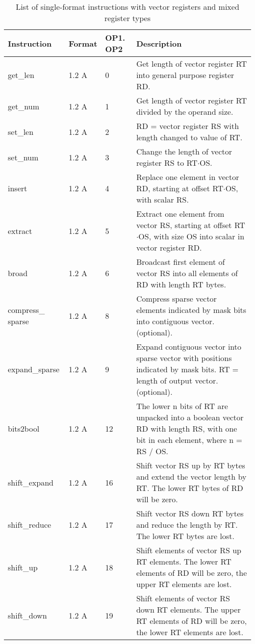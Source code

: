 \documentclass[forwardcom.tex]{subfiles}
\begin{document}
\begin{longtable} {|p{25mm}|p{14mm}|p{10mm}|p{95mm}|}
\caption{List of single-format instructions with vector registers and mixed register types} 
\label{table:ListOfSingleFormatInstructionsVector} \\
\endfirsthead
\endhead
\hline
\bfseries Instruction & \bfseries Format &\bfseries OP1. OP2 & \bfseries Description \\
\hline
get\_len      & 1.2 A &  0 & Get length of vector register RT into general purpose register RD. \\
get\_num      & 1.2 A &  1 & Get length of vector register RT divided by the operand size. \\
set\_len      & 1.2 A &  2 & RD = vector register RS with length changed to value of RT. \\
set\_num      & 1.2 A &  3 & Change the length of vector register RS to RT$\cdot$OS. \\
insert        & 1.2 A &  4 & Replace one element in vector RD, starting at offset RT$\cdot$OS, with scalar RS. \\
extract       & 1.2 A & 5 & Extract one element from vector RS, starting at offset RT$\cdot$OS, with size OS into scalar in vector register RD. \\
broad         & 1.2 A & 6 & Broadcast first element of vector RS into all elements of RD with length RT bytes. \\
compress\_ sparse& 1.2 A &  8 & Compress sparse vector elements indicated by mask bits into contiguous vector. (optional). \\
expand\_sparse& 1.2 A & 9 & Expand contiguous vector into sparse vector with positions indicated by mask bits. RT = length of output vector. (optional). \\

bits2bool     & 1.2 A & 12 & The lower n bits of RT are unpacked into a boolean vector RD with length RS, with one bit in each element, where n = RS / OS. \\

shift\_expand & 1.2 A & 16 & Shift vector RS up by RT bytes and extend the vector length by RT. The lower RT bytes of RD will be zero. \\
shift\_reduce & 1.2 A & 17 & Shift vector RS down RT bytes and reduce the length by RT. The lower RT bytes are lost. \\
shift\_up     & 1.2 A & 18 & Shift elements of vector RS up RT elements. The lower RT elements of RD will be zero, the upper RT elements are lost. \\
shift\_down   & 1.2 A & 19 & Shift elements of vector RS down RT elements. The upper RT elements of RD will be zero, the lower RT elements are lost. \\


\end{longtable}
\end{document}
